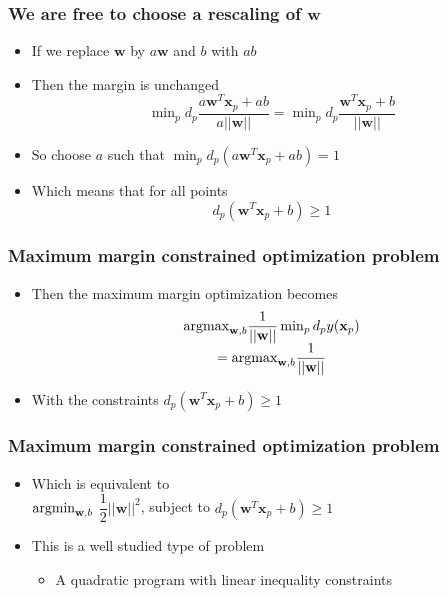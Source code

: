 \documentclass[12pt,notes,mathserif]{beamer}
\begin{document}
\begin{frame}[c]
\frametitle{We are free to choose a rescaling of $\mathbf{w}$}
\begin{itemize}
\item If we replace $\mathbf{w}$ by $a\mathbf{w}$ and $b$ with $ab$
\item Then the margin is unchanged
\[
\min\nolimits_pd_p\dfrac{a\mathbf{w}^T\mathbf{x}_p+ab}{a||\mathbf{w}||}=
\min\nolimits_pd_p
\dfrac{\mathbf{w}^T\mathbf{x}_p+b}{||\mathbf{w}||}
\]
\item So choose $a$ such that $\min_pd_p(a\mathbf{w}^T\mathbf{x}_p+ab)=1$
\item Which means that for all points 
\[
d_p(\mathbf{w}^T\mathbf{x}_p+b)\geqslant{}1
\]
\end{itemize}
\end{frame}


\begin{frame}[c]
\frametitle{Maximum margin constrained optimization problem}
\begin{itemize}
\item Then the maximum margin optimization becomes
\[
\begin{array}{c}
{\mathop{\mathrm{argmax}}}_{\mathbf{w},b}\dfrac{1}{||\mathbf{w}||} \min_pd_py(\mathbf{x}_p)\\
= {\mathop{\mathrm{argmax}}}_{\mathbf{w},b}\dfrac{1}{||\mathbf{w}||}
\end{array}
\]
\item With the constraints $d_p(\mathbf{w}^T\mathbf{x}_p+b)\geqslant{}1$
\end{itemize}
\end{frame}

\begin{frame}[c]
\frametitle{Maximum margin constrained optimization problem}
\begin{itemize}
\item Which is equivalent to \\
$\mathop{\mathrm{argmin}}_{\mathbf{w},b}$ $\dfrac{1}{2}||\mathbf{w}||^2$, subject to $d_p(\mathbf{w}^T\mathbf{x}_p+b)\geqslant{}1$
\item This is a well studied type of problem
\begin{itemize}
\item A quadratic program with linear inequality constraints
\end{itemize}
\end{itemize}
\end{frame}
\end{document}
